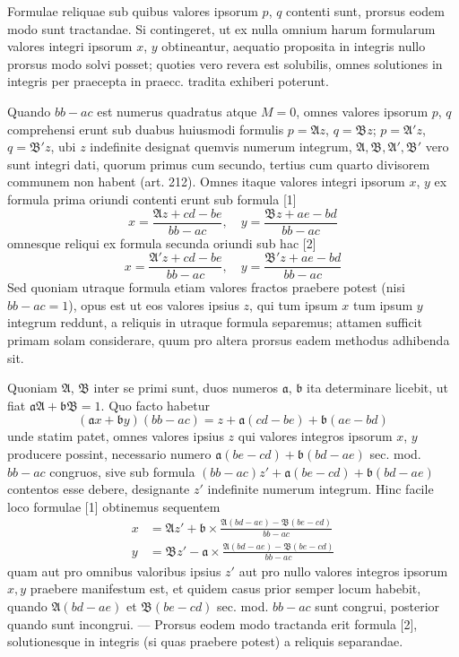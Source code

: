 Formulae reliquae sub quibus valores ipsorum $p$, $q$ contenti sunt, prorsus
eodem modo sunt tractandae. Si contingeret, ut ex nulla omnium harum formularum
valores integri ipsorum $x$, $y$ obtineantur, aequatio proposita in integris
nullo prorsus modo solvi posset; quoties vero revera est solubilis, omnes solutiones
in integris per praecepta in praecc. tradita exhiberi poterunt.

Quando $bb-ac$ est numerus quadratus atque $M=0$, omnes valores ipsorum
$p$, $q$ comprehensi erunt sub duabus huiusmodi formulis $p=\mathfrak{A}z$,
$q=\mathfrak{B}z$; $p=\mathfrak{A}'z$, $q=\mathfrak{B}'z$, ubi $z$
indefinite designat quemvis numerum integrum, $\mathfrak{A},\mathfrak{B},\mathfrak{A}',\mathfrak{B}'$
vero sunt integri dati, quorum primus cum secundo, tertius cum quarto divisorem
communem non habent (art. 212). Omnes itaque valores integri ipsorum $x$, $y$
ex formula prima oriundi contenti erunt sub formula [1]
\[
x=\frac{\mathfrak{A}z+cd-be}{bb-ac},\quad
y=\frac{\mathfrak{B}z+ae-bd}{bb-ac}
\]
omnesque reliqui ex formula secunda oriundi sub hac [2]
\[
x=\frac{\mathfrak{A}'z+cd-be}{bb-ac},\quad
y=\frac{\mathfrak{B}'z+ae-bd}{bb-ac}
\]
Sed quoniam utraque formula etiam valores fractos praebere potest (nisi $bb-ac=1$),
opus est ut eos valores ipsius $z$, qui tum ipsum $x$ tum ipsum $y$ integrum
reddunt, a reliquis in utraque formula separemus; attamen sufficit primam solam
considerare, quum pro altera prorsus eadem methodus adhibenda sit.

Quoniam $\mathfrak{A}$, $\mathfrak{B}$ inter se primi sunt, duos numeros
$\mathfrak{a}$, $\mathfrak{b}$ ita determinare licebit, ut fiat
$\mathfrak{a}\mathfrak{A}+\mathfrak{b}\mathfrak{B}=1$. Quo facto habetur
\[
(\mathfrak{a}x+\mathfrak{b}y)(bb-ac)=z+\mathfrak{a}(cd-be)+\mathfrak{b}(ae-bd)
\]
unde statim patet, omnes valores ipsius $z$ qui valores integros ipsorum $x$, $y$
producere possint, necessario numero $\mathfrak{a}(be-cd)+\mathfrak{b}(bd-ae)$
sec. mod. $bb-ac$ congruos, sive sub formula
$(bb-ac)z'+\mathfrak{a}(be-cd)+\mathfrak{b}(bd-ae)$ contentos esse debere,
designante $z'$ indefinite numerum integrum. Hinc facile loco formulae [1]
obtinemus sequentem
\[
\begin{aligned}
x&=\mathfrak{A}z'+\mathfrak{b}\times\frac{\mathfrak{A}(bd-ae)-\mathfrak{B}(be-cd)}{bb-ac}\\
y&=\mathfrak{B}z'-\mathfrak{a}\times\frac{\mathfrak{A}(bd-ae)-\mathfrak{B}(be-cd)}{bb-ac}
\end{aligned}
\]
quam aut pro omnibus valoribus ipsius $z'$ aut pro nullo valores integros ipsorum
$x,y$ praebere manifestum est, et quidem casus prior semper locum habebit, quando
$\mathfrak{A}(bd-ae)$ et $\mathfrak{B}(be-cd)$ sec. mod. $bb-ac$ sunt congrui,
posterior quando sunt incongrui. --- Prorsus eodem modo tractanda erit formula [2],
solutionesque in integris (si quas praebere potest) a reliquis separandae.

